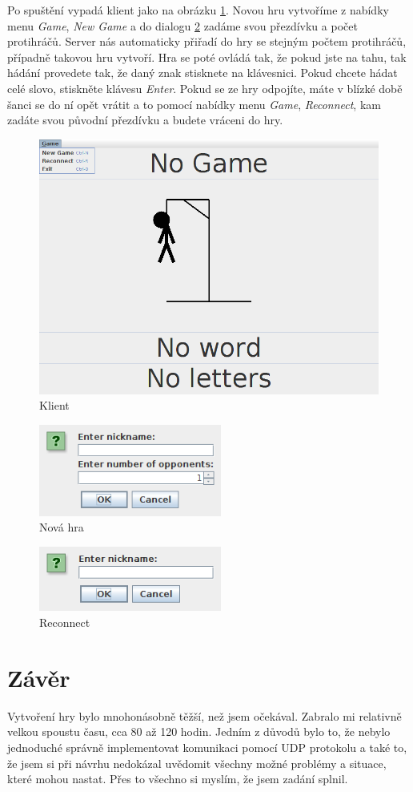\documentclass[12pt, a4paper]{article}
\begin{document}
	Po spuštění vypadá klient jako na obrázku \ref{Klient}. Novou hru vytvoříme z nabídky menu \emph{Game}, \emph{New Game} a do dialogu \ref{NewGame} zadáme svou přezdívku a počet protihráčů. Server nás automaticky přiřadí do hry se stejným počtem protihráčů, případně takovou hru vytvoří. Hra se poté ovládá tak, že pokud jste na tahu, tak hádání provedete tak, že daný znak stisknete na klávesnici. Pokud chcete hádat celé slovo, stiskněte klávesu \emph{Enter}. Pokud se ze hry odpojíte, máte v blízké době šanci se do ní opět vrátit a to pomocí nabídky menu \emph{Game}, \emph{Reconnect}, kam zadáte svou původní přezdívku a budete vráceni do hry.
	\begin{figure}[ht!]
		\centering
		\caption{Klient}
		\label{Klient}
		\includegraphics[width=13cm]{img/Client.png}
	\end{figure}
	\begin{figure}[ht!]
		\centering
		\caption{Nová hra}
		\label{NewGame}
		\includegraphics[width=6cm]{img/NewGame.png}
	\end{figure}
	\begin{figure}[ht!]
		\centering
		\caption{Reconnect}
		\label{Reconnect}
		\includegraphics[width=6cm]{img/Reconnect.png}
	\end{figure}
	
	\section{Závěr}
	Vytvoření hry bylo mnohonásobně těžší, než jsem očekával. Zabralo mi relativně velkou spoustu času, cca 80 až 120 hodin. Jedním z důvodů bylo to, že nebylo jednoduché správně implementovat komunikaci pomocí UDP protokolu a také to, že jsem si při návrhu nedokázal uvědomit všechny možné problémy a situace, které mohou nastat. Přes to všechno si myslím, že jsem zadání splnil.
	
\end{document}
